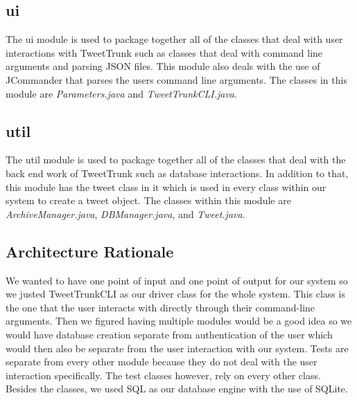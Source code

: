 \documentclass[a4paper, 12pt]{article}
\begin{document}
\begin{adjustwidth}{2em}{0pt}
\subsection{ui} \label{sec:archb}
\begin{adjustwidth}{2em}{0pt}
The ui module is used to package together all of the classes that deal with user interactions with TweetTrunk such as classes that deal with command line arguments and parsing JSON files. This module also deals with the use of JCommander that parses the users command line arguments. The classes in this module are \textit{Parameters.java} and \textit{TweetTrunkCLI.java}.


\end{adjustwidth}
\subsection{util} \label{sec:archc}
\begin{adjustwidth}{2em}{0pt}
The util module is used to package together all of the classes that deal with the back end work of TweetTrunk such as database interactions. In addition to that, this module has the tweet class in it which is used in every class within our system to create a tweet object. The classes within this module are \textit{ArchiveManager.java},  \textit{DBManager.java}, and \textit{Tweet.java}. 


\end{adjustwidth}
\end{adjustwidth}



\subsection{Architecture Rationale} \label{sec:rationale}
\begin{adjustwidth}{2em}{0pt}
We wanted to have one point of input and one point of output for our system so we justed TweetTrunkCLI as our driver class for the whole system. This class is the one that the user interacts with directly through their command-line arguments. Then we figured having multiple modules would be a good idea so we would have database creation separate from authentication of the user which would then also be separate from the user interaction with our system. Tests are separate from every other module because they do not deal with the user interaction specifically. The test classes however, rely on every other class. \newline\newline
Besides the classes, we used SQL as our database engine with the use of SQLite. 
\end{adjustwidth}
\end{document}
